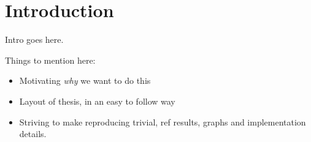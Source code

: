 \documentclass[Thesis.tex]{subfiles}
\begin{document}
\chapter{Introduction}
\label{chp:introduction}

Intro goes here.

Things to mention here:
\begin{itemize}
  \item Motivating \emph{why} we want to do this
  \item Layout of thesis, in an easy to follow way
  \item Striving to make reproducing trivial, ref results, graphs and
    implementation details.
\end{itemize}
\end{document}

